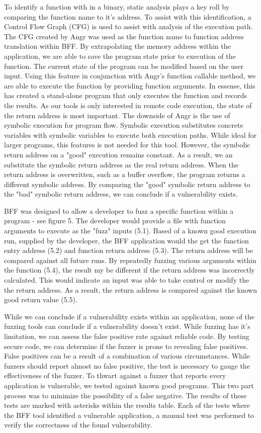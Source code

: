\documentclass[conference]{IEEEtran}
\begin{document}
To identify a function with in a binary, static analysis plays a key roll by comparing the function name to it's address. To assist with this identification, a Control Flow Graph (CFG) is used to assist with analysis of the execution path. The CFG created by Angr was used as the function name to function address translation within BFF. By extrapolating the memory address within the application, we are able to save the program state prior to execution of the function. The current state of the program can be modified based on the user input. Using this  feature in conjunction with Angr's function callable method, we are able to execute the function by providing function arguments. In essense, this has created a stand-alone program that only executes the function and records the results. As our  tools is only interested in remote code execution, the state of the return address is most important. The downside of Angr is the use of symbolic execution for program flow. Symbolic execution substitutes concrete variables with symbolic variables to execute both execution paths. While ideal for larger programs, this features is not needed for this tool. However, the symbolic return address on a "good" execution remains constant. As a result, we an substitute the symbolic return address as the real return address. When the return address is overwritten, such as a buffer overflow, the program returns a different symbolic address. By comparing the "good" symbolic return address to the "bad" symbolic return address, we can conclude if a vulnerability exists.

BFF was designed to allow a developer to fuzz a specific function within a program - see figure 5. The developer would provide a file with function arguments to execute as the "fuzz" inputs (5.1). Based of a known good execution run, supplied by the developer, the BFF application would the get the function entry address (5.2) and function return address (5.3). The return address will be compared against all future runs. By repeatedly fuzzing various arguments within the function (5.4), the result my be different if the return address was incorrectly calculated. This would indicate an input was able to take control or modify the the return address. As a result, the return address is compared against the known good return value (5.5).  

While we can conclude if a vulnerability exists within an application, none of the fuzzing tools can conclude if a vulnerability doesn't exist. While fuzzing has it's limitation, we can assess the false positive rate against reliable code. By testing secure code, we can determine if the fuzzer is prone to revealing false positives. False positives can be a result of a combination of various circumstances. While fuzzers should report almost no false positive, the test is necessary to gauge the effectiveness of the fuzzer. To thwart against a fuzzer that reports every application is vulnerable, we tested against known good programs. This two part process was to minimize the possibility of a false negative. The results of these tests are marked with asterisks within the results table. Each of the tests where the BFF tool identified a vulnerable application, a manual test was performed to verify the correctness of the found vulnerability.  
\end{document}
